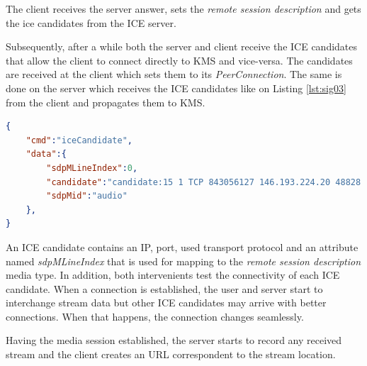 The client receives the server answer, sets the \emph{remote session description} and gets the ice candidates from the \ac{ICE} server.

Subsequently, after a while both the server and client receive the \ac{ICE} candidates that allow the client to connect directly to \ac{KMS} and vice-versa. The candidates are received at the client which sets them to its \emph{PeerConnection}. The same is done on the server which receives the \ac{ICE} candidates like on Listing \ref{lst:sig03} from the client and propagates them to \ac{KMS}.

\begin{minipage}{\linewidth}
\begin{lstlisting}[caption={ICE candidates sent by KMS and client},label={lst:sig03},language=json]
{
	"cmd":"iceCandidate",
	"data":{
		"sdpMLineIndex":0,
		"candidate":"candidate:15 1 TCP 843056127 146.193.224.20 48828 typ srflx raddr 192.168.1.105 rport 48828 tcptype passive",
		"sdpMid":"audio"
	},
}
\end{lstlisting}
\end{minipage}

An \ac{ICE} candidate contains an \ac{IP}, port, used transport protocol and an attribute named \emph{sdpMLineIndex} that is used for mapping to the \emph{remote session description} media type.
In addition, both intervenients test the connectivity of each \ac{ICE} candidate. When a connection is established, the user and server start to interchange stream data but other \ac{ICE} candidates may arrive with better connections. When that happens, the connection changes seamlessly. 

Having the media session established, the server starts to record any received stream and the client creates an \ac{URL} correspondent to the stream location.


